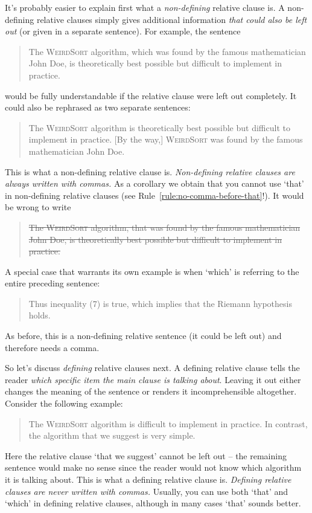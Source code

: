 It's probably easier to explain first what a \emph{non-defining}
relative clause is. A non-defining relative clauses simply gives
additional information \emph{that could also be left out} (or given in
a separate sentence). For example, the sentence
\begin{quote}
  The \textsc{WeirdSort} algorithm, which was found by the famous
  mathematician John Doe, is theoretically best possible but difficult
  to implement in practice.
\end{quote}
would be fully understandable if the relative clause were left out
completely. It could also be rephrased as two separate sentences:
\begin{quote}
  The \textsc{WeirdSort} algorithm is theoretically best possible but
  difficult to implement in practice. [By the way,] \textsc{WeirdSort}
  was found by the famous mathematician John Doe.
\end{quote}
This is what a non-defining relative clause is. \emph{Non-defining
  relative clauses are always written with commas.} As a corollary we
obtain that you cannot use `that' in non-defining relative clauses
(see Rule~\ref{rule:no-comma-before-that}!). It would be wrong to
write
\begin{quote}
  \st{The \textsc{WeirdSort} algorithm, that was found by the famous
    mathematician John Doe, is theoretically best possible but
    difficult to implement in practice.}
\end{quote}
A special case that warrants its own example is when `which' is
referring to the entire preceding sentence:
\begin{quote}
  Thus inequality (7) is true, which implies that the Riemann
  hypothesis holds.
\end{quote}
As before, this is a non-defining relative sentence (it could be left
out) and therefore needs a comma.

So let's discuss \emph{defining} relative clauses next. A defining
relative clause tells the reader \emph{which specific item the main
  clause is talking about}. Leaving it out either changes the meaning
of the sentence or renders it incomprehensible altogether.  Consider
the following example:

\begin{quote}
  The \textsc{WeirdSort} algorithm is difficult to implement in
  practice. In contrast, the algorithm that we suggest is very simple.
\end{quote}

Here the relative clause `that we suggest' cannot be left out -- the
remaining sentence would make no sense since the reader would not know
which algorithm it is talking about. This is what a defining relative
clause is. \textit{Defining relative clauses are never written with
  commas.} Usually, you can use both `that' and `which' in defining
relative clauses, although in many cases `that' sounds better.

